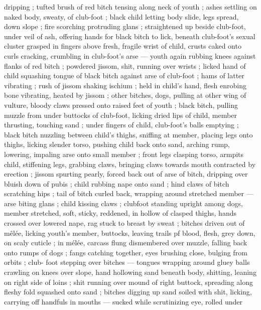 dripping ; tufted brush of red bitch tensing along neck of youth ; 
ashes settling on naked body, sweaty, of club-foot ; black child 
letting body slide, legs spread, down slope ; fire scorching 
protruding glans ; straightened up beside club-foot, under veil of 
ash, offering hands for black bitch to lick, beneath club-foot's sexual 
cluster grasped in fingers \col above fresh, fragile wrist of child, crusts 
caked onto curls cracking, crumbling in club-foot's arse --- youth 
again rubbing knees against flanks of red bitch ; powdered jissom, 
shit, running over wrists ; licked hand of child squashing tongue of 
black bitch against arse of club-foot ; hams of latter vibrating ; rush 
of jissom shaking ischium ; held in child's hand, flesh enrobing bone 
vibrating, heated by jissom ; other bitches, dogs, pulling at other 
wing of vulture, bloody claws pressed onto raised feet of youth ; 
black bitch, pulling muzzle from under buttocks of club-foot, licking 
dried lips of child, member thrusting, touching sand ; under fingers 
of child, club-foot's balls emptying ; black bitch nuzzling between 
child's thighs, sniffing at member, placing legs onto thighs, licking 
slender torso, pushing child back onto sand, arching rump, lowering, 
impaling arse onto small member ; front legs clasping torso, armpits 
{\col} child, stiffening legs, grabbing claws, bringing claws towards mouth 
contracted by erection ; jissom spurting {\col} pearly, forced back out of 
arse of bitch, dripping over bluish down of pubis ; child rubbing 
nape onto sand ; hind claws of bitch scratching hips ; tail of bitch 
curled back, wrapping around stretched member --- arse biting glans 
; child kissing claws ; clubfoot standing upright among dogs, member 
stretched, soft, sticky, reddened, in hollow of clasped thighs, hands 
crossed over lowered nape, rag stuck to breast by sweat ; bitches 
driven out of m\^{e}l\'{e}e, licking youth's member, buttocks, leaving trails 
pf blood, flesh, grey down, on scaly cuticle ; in mélée, carcass flung 
dismembered over muzzle, falling back onto rumps of dogs ; fangs 
catching together, eyes brushing close, bulging from orbits ; club- 
foot stepping over bitches --- tongues wrapping around gluey balls 
{\dashcom} crawling on knees over slope, hand hollowing sand beneath 
body, shitting, leaning on right side of loins ; shit running over 
mound of right buttock, spreading along fleshy fold squashed onto 
sand ; bitches digging up sand soiled with shit, licking, carrying off 
handfuls in mouths --- sucked while scrutinizing eye, rolled under 
